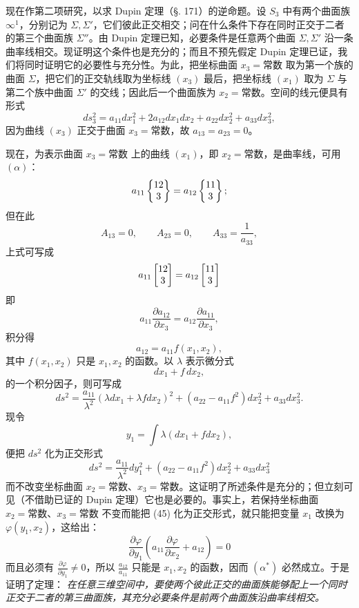 现在作第二项研究，以求 Dupin 定理（\S. 171）的逆命题。设 \(S_3\) 中有两个曲面族 \(\infty^1\)，分别记为 \(\Sigma,\Sigma'\)，它们彼此正交相交；问在什么条件下存在同时正交于二者的第三个曲面族 \(\Sigma''\)。由 Dupin 定理已知，必要条件是任意两个曲面 \(\Sigma,\Sigma'\) 沿一条曲率线相交。现证明这个条件也是充分的；而且不预先假定 Dupin 定理已证，我们将同时证明它的必要性与充分性。为此，把坐标曲面 \(x_3=\text{常数}\) 取为第一个族的曲面 \(\Sigma\)，把它们的正交轨线取为坐标线 \((x_3)\) 最后，把坐标线 \((x_1)\) 取为 \(\Sigma\) 与第二个族中曲面 \(\Sigma'\) 的交线；因此后一个曲面族为 \(x_2=\text{常数}\)。空间的线元便具有形式
\[
\tag{45}
 ds_3^2=a_{11}dx_1^2+2a_{12}dx_1dx_2+a_{22}dx_2^2+a_{33}dx_3^2,
\]
因为曲线 \((x_3)\) 正交于曲面 \(x_3=\text{常数}\)，故 \(a_{13}=a_{23}=0\)。

现在，为表示曲面 \(x_3=\text{常数}\) 上的曲线 \((x_1)\)，即 \(x_2=\text{常数}\)，是曲率线，可用 \((\alpha)\)：
\[
 a_{11}\left\{\begin{matrix}12\\3\end{matrix}\right\}=a_{12}\left\{\begin{matrix}11\\3\end{matrix}\right\};
\]
但在此
\[
 A_{13}=0,\qquad A_{23}=0,\qquad A_{33}=\frac1{a_{33}},
\]
上式可写成
\[
 a_{11}\left[\begin{matrix}12\\3\end{matrix}\right]=a_{12}\left[\begin{matrix}11\\3\end{matrix}\right]
\]
即
\[
\tag{$\alpha^*$}
 a_{11}\frac{\partial a_{12}}{\partial x_3}
=a_{12}\frac{\partial a_{11}}{\partial x_3},
\]
积分得
\[
 a_{12}=a_{11}f(x_1,x_2),
\]
其中 \(f(x_1,x_2)\) 只是 \(x_1,x_2\) 的函数。以 \(\lambda\) 表示微分式
\[
 dx_1+f\,dx_2,
\]
的一个积分因子，则可写成
\[
 ds^2=\frac{a_{11}}{\lambda^2}(\lambda dx_1+\lambda f dx_2)^2
 +(a_{22}-a_{11}f^2)dx_2^2+a_{33}dx_3^2.
\]
现令
\[
 y_1=\int \lambda(dx_1+f dx_2),
\]
便把 \(ds^2\) 化为正交形式
\[
 ds^2=\frac{a_{11}}{\lambda^2}dy_1^2+(a_{22}-a_{11}f^2)dx_2^2+a_{33}dx_3^2
\]
而不改变坐标曲面 \(x_2=\text{常数}\)、\(x_3=\text{常数}\)。这证明了所述条件是充分的；但立刻可见（不借助已证的 Dupin 定理）它也是必要的。事实上，若保持坐标曲面 \(x_2=\text{常数}\)、\(x_3=\text{常数}\) 不变而能把 (45) 化为正交形式，就只能把变量 \(x_1\) 改换为 \(\varphi(y_1,x_2)\)，这给出：
\[
 \frac{\partial\varphi}{\partial y_1}\left(a_{11}\frac{\partial\varphi}{\partial x_2}+a_{12}\right)=0
\]
而且必须有 \(\frac{\partial\varphi}{\partial y_1}\ne0\)，所以 \(\frac{a_{12}}{a_{11}}\) 只能是 \(x_1,x_2\) 的函数，因而 \((\alpha^*)\) 必然成立。于是证明了定理：
\emph{在任意三维空间中，要使两个彼此正交的曲面族能够配上一个同时正交于二者的第三曲面族，其充分必要条件是前两个曲面族沿曲率线相交。}

